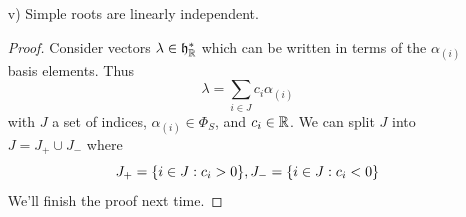 \begin{enumerate}
\begin{proof}
    \end{proof}
    \item[v)] Simple roots are linearly independent.
    \begin{proof}
    Consider vectors $\lambda\in \mathfrak{h}^*_{\mathbb{R}}$ which can be written in terms of the $\alpha_{(i)}$ basis elements. Thus
    $$\lambda=\sum_{i\in J} c_i \alpha_{(i)}$$
    with $J$ a set of indices, $\alpha_{(i)}\in \Phi_S$, and $c_i\in \mathbb{R}$. We can split $J$ into $J=J_+ \cup J_-$ where
    $$J_+=\{i\in J: c_i >0\},J_-=\{i\in J: c_i <0\}$$
    We'll finish the proof next time.
    \end{proof}
\end{enumerate}
